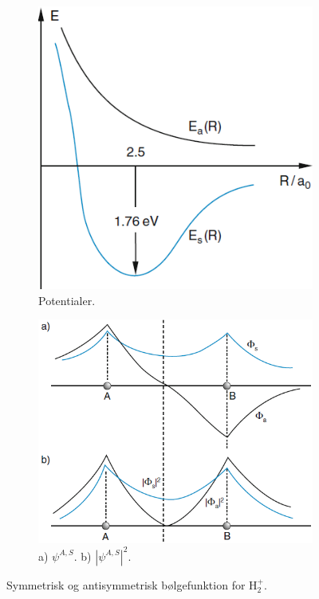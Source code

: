 \begin{figure}[!h]
    \centering
    \begin{subfigure}[t]{0.40\textwidth}
        \centering
        \includegraphics[width=.9\columnwidth]{Q19/images/PotentialCurvesForSymmetricAndAssymetricWaveFunctionH2.PNG}
        \caption{Potentialer.}
        \label{fig:Q19_PotentialCurvesForSymmetricAndAntisymmetricWaveFunctionH2}
    \end{subfigure}
    \hfill
    \begin{subfigure}[t]{0.45\textwidth}
        \centering
        \includegraphics[width=\columnwidth]{Q19/images/SymmetriskOgAntisymmetriskBoelgefunktionForH2.PNG}
        \caption{a) $\psi^{A,S}$. b) $|\psi^{A,S}|^2$.}
        \label{fig:Q19_SymmetricAndAntisymmetricWaveFunctionsAndTheirProbability}
    \end{subfigure}
    \caption{Symmetrisk og antisymmetrisk bølgefunktion for $\text{H}_2^+$.}
    \label{fig:Q19_SymmetricAndAntisymmetricWaveFunctionsOfH2PlusIon}
\end{figure}


